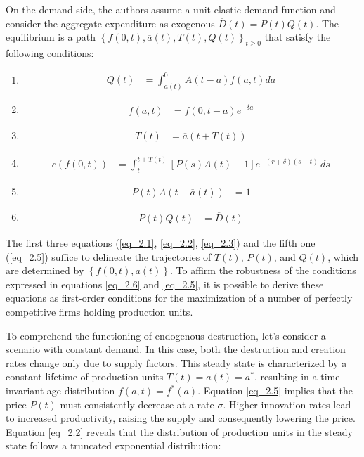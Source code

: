 \documentclass[12pt]{article}
\begin{document}
On the demand side, the authors assume a unit-elastic demand function and consider the aggregate expenditure as
exogenous 
\(\overline{D}(t)=P(t)Q(t)\). 
The equilibrium is a path \(\left\{f(0,t),\overline{a}(t),T(t),Q(t)\right\}_{t \geq 0}\) that satisfy the following
conditions:
\begin{enumerate}
    \item \label{eq_2.1} 
        \begin{align*}
            Q(t) &= \int_{\overline{a}(t)}^{0}A(t-a)f(a,t)da
        \end{align*}
    \item \label{eq_2.2}
        \begin{align*}
            f(a,t)&=f(0,t-a)e^{-\delta a}      
        \end{align*}
    \item \label{eq_2.3}
        \begin{align*}
            T(t)&=\overline{a}\left(t+T(t)\right)        
        \end{align*}
    \item \label{eq_2.4}
        \begin{align*}
            c(f(0,t))&=\int_{t}^{t+T(t)}\left[P(s)A(t)-1\right]e^{-(r+\delta)(s-t)}\,ds
        \end{align*}
    \item \label{eq_2.5}
        \begin{align*}
            P(t)A(t-\overline{a}(t))&=1
        \end{align*}
    \item \label{eq_2.6}
        \begin{align*}
            P(t)Q(t)&=\overline{D}(t)
        \end{align*}
\end{enumerate}

The first three equations (\ref{eq_2.1}, \ref{eq_2.2}, \ref{eq_2.3}) and the fifth one (\ref{eq_2.5}) suffice to
delineate the trajectories of \(T(t)\), \(P(t)\), and \(Q(t)\), which are determined by \(\left\{f(0,t),
\overline{a}(t)\right\}\). To affirm the robustness of the conditions expressed in equations \ref{eq_2.6} and
\ref{eq_2.5}, it is possible to derive these equations as first-order conditions for the maximization of a number of
perfectly competitive firms holding production units. 

To comprehend the functioning of endogenous destruction, let's consider a scenario with constant demand. In this case,
both the destruction and creation rates change only due to supply factors. This steady state is characterized by a
constant lifetime of production units \(T(t) = \overline{a}(t) = \overline{a}^*\), resulting in a time-invariant age
distribution \(f(a,t) = f^*(a)\). Equation \ref{eq_2.5} implies that the price \(P(t)\) must consistently decrease at a
rate \(\sigma\). Higher innovation rates lead to increased productivity, raising the supply and consequently lowering
the price. Equation \ref{eq_2.2} reveals that the distribution of production units in the steady state follows a
truncated exponential distribution: 
\end{document}
